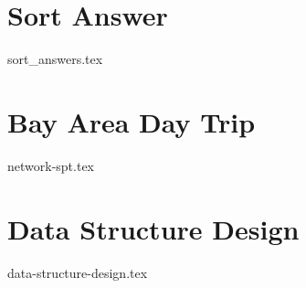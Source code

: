 \documentclass[11pt]{exam}
\begin{document}
\newpage
\section{Sort Answer}
\begin{questions}
{sort_answers.tex}
\end{questions}


\newpage
\section{Bay Area Day Trip}
\begin{questions}
{network-spt.tex}
\end{questions}

\newpage
\section{Data Structure Design}
\begin{questions}
{data-structure-design.tex}
\end{questions}
\end{document}
